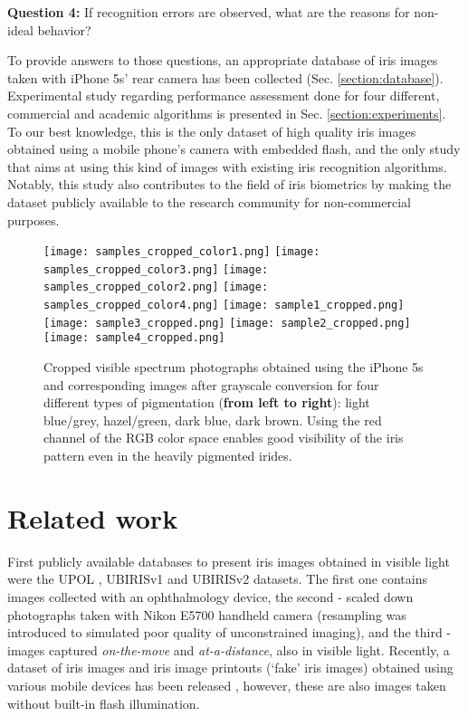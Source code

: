 \documentclass[10pt,twocolumn,letterpaper]{article}
\begin{document}
\textbf{Question 4:} If recognition errors are observed, what are the reasons for non-ideal behavior? 

To provide answers to those questions, an appropriate database of iris images taken with iPhone 5s' rear camera has been collected (Sec. \ref{section:database}). Experimental study regarding performance assessment done for four different, commercial and academic algorithms is presented in Sec. \ref{section:experiments}. To our best knowledge, this is the only dataset of high quality iris images obtained using a mobile phone's camera with embedded flash, and the only study that aims at using this kind of images with existing iris recognition algorithms. Notably, this study also contributes to the field of iris biometrics by making the dataset publicly available to the research community for non-commercial purposes. 

\begin{figure*}[!t]
\centering
\texttt{[image: samples\_cropped\_color1.png]}\hfill
\texttt{[image: samples\_cropped\_color3.png]}\hfill
\texttt{[image: samples\_cropped\_color2.png]}\hfill
\texttt{[image: samples\_cropped\_color4.png]}
\vfill
\texttt{[image: sample1\_cropped.png]}\hfill
\texttt{[image: sample3\_cropped.png]}\hfill
\texttt{[image: sample2\_cropped.png]}\hfill
\texttt{[image: sample4\_cropped.png]}
\vskip0.2cm
\caption{Cropped visible spectrum photographs obtained using the iPhone 5s and corresponding images after grayscale conversion for four different types of pigmentation (\textbf{from left to right}): light blue/grey, hazel/green, dark blue, dark brown. Using the red channel of the RGB color space enables good visibility of the iris pattern even in the heavily pigmented irides.}
\label{fig:samples_converted}
\end{figure*}

\section{Related work}
\label{section:related}
First publicly available databases to present iris images obtained in visible light were the UPOL \cite{UPOLCzechy2004}, UBIRISv1 \cite{UBIRISv1} and UBIRISv2 \cite{UBIRISv2} datasets. The first one contains images collected with an ophthalmology device, the second - scaled down photographs taken with Nikon E5700 handheld camera (resampling was introduced to simulated poor quality of unconstrained imaging), and the third - images captured \emph{on-the-move} and \emph{at-a-distance}, also in visible light. Recently, a dataset of iris images and iris image printouts (`fake' iris images) obtained using various mobile devices has been released \cite{MICHE2015}, however, these are also images taken without built-in flash illumination.  
\end{document}
